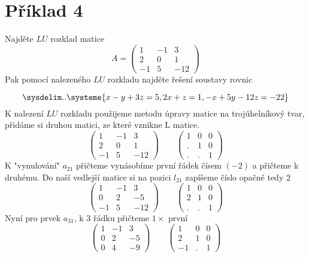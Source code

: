 \newpage
\section*{Příklad 4}
Najděte $LU$ rozklad matice
$$
A =
\begin{pmatrix}
  1  & -1 & 3   \\
  2  & 0  & 1   \\
  -1 & 5  & -12
\end{pmatrix}
$$
Pak pomocí nalezeného $LU$ rozkladu najděte řešení soustavy rovnic

\begin{equation*}
  \sysdelim..\systeme{
    x - y + 3z = 5,
    2x + z = 1,
    -x + 5y -12z = -22
  }
\end{equation*}
K nalezení $LU$ rozkladu použijeme metodu úpravy matice na trojúhelníkový tvar, přidáme si druhou matici, ze které vznikne L matice.
$$
\begin{pmatrix}
  1  & -1 & 3   \\
  2  & 0  & 1   \\
  -1 & 5  & -12
\end{pmatrix}
\qquad
\begin{pmatrix}
  1 & 0 & 0 \\
  . & 1 & 0 \\
  . & . & 1 
\end{pmatrix}
$$
K "vynulování" $a_{21}$ přičteme vynásobíme první řádek čísem $(-2)$ a přičteme k druhému. Do naší vedlejší matice si na pozici $l_{21}$ zapíšeme číslo opačné tedy $2$
$$
\begin{pmatrix}
  1  & -1 & 3   \\
  0  & 2  & -5   \\
  -1 & 5  & -12
\end{pmatrix}
\qquad
\begin{pmatrix}
  1 & 0 & 0 \\
  2 & 1 & 0 \\
  . & . & 1 
\end{pmatrix}
$$
Nyní pro prvek $a_{31}$, k $3$ řádku přičteme $1\times$ první
$$
\begin{pmatrix}
  1  & -1 & 3   \\
  0  & 2 & -5   \\
  0 & 4  & -9
\end{pmatrix}
\qquad
\begin{pmatrix}
  1 & 0 & 0 \\
  2 & 1 & 0 \\
  -1 & . & 1 
\end{pmatrix}
$$
